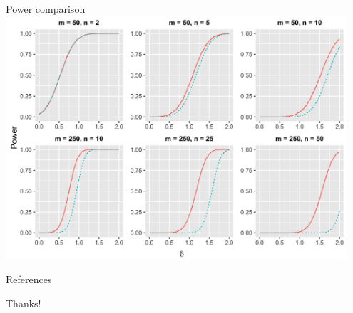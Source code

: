 \documentclass{beamer}
\begin{document}
\begin{frame}{Power comparison}
\centering
\includegraphics[width=0.95\textwidth]{multinomial-power.png}
\end{frame}

\begin{frame}[allowframebreaks]{References}
\footnotesize{}
\end{frame}

\begin{frame}
\centering
{\Large Thanks!}
\end{frame}
\end{document}
